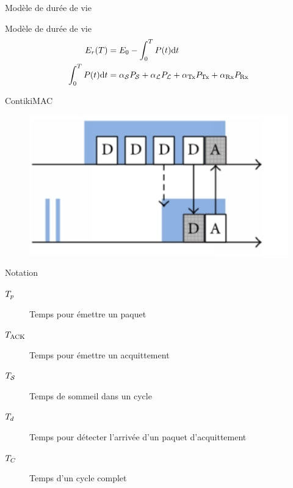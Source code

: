 \begin{frame}{Modèle de durée de vie}
    \begin{alertblock}{Modèle de durée de vie}
    \begin{align}
      E_r(T) &= E_0 - \int_0^T P(t) \mathrm{d}t\\
      \int_0^T P(t) \mathrm{d}t &= \alpha_{\mathcal{S}} P_{\mathcal{S}} + \alpha_{\mathcal{L}} P_{\mathcal{L}} + \alpha_{\textrm{Tx}} P_{\textrm{Tx}} + \alpha_{\textrm{Rx}} P_{\textrm{Rx}}
    \end{align}
  \end{alertblock}

\end{frame}

\begin{frame}{ContikiMAC}
  \begin{figure}
    \centering
    \includegraphics{figures/contikimac.png}
  \end{figure}
  \begin{block}{Notation}
    \begin{description}
      \item[$T_{p}$] Temps pour émettre un paquet
      \item[$T_{\textrm{ACK}}$] Temps pour émettre un acquittement
      \item[$T_{\mathcal{S}}$] Temps de sommeil dans un cycle
      \item[$T_{d}$] Temps pour détecter l'arrivée d'un paquet d'acquittement
      \item[$T_{C}$] Temps d'un cycle complet
    \end{description}
  \end{block}
\end{frame}

